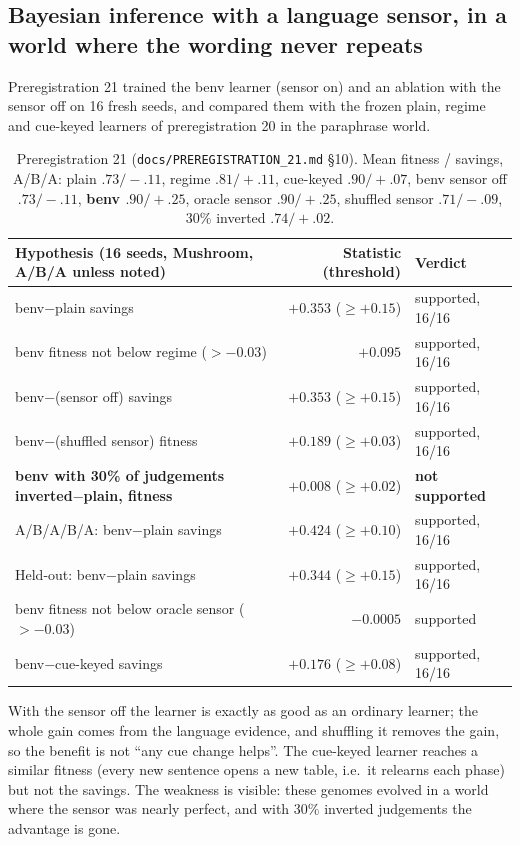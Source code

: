 \documentclass[11pt]{article}
\begin{document}
\subsection{Bayesian inference with a language sensor, in a world where the wording never repeats}
Preregistration 21 trained the benv learner (sensor on) and an ablation with the sensor off on 16 fresh seeds, and compared them with the frozen plain, regime and cue-keyed learners of preregistration 20 in the paraphrase world.
\begin{table}[h]\centering\small
\begin{tabular}{@{}p{6.3cm}rl@{}}\toprule
Hypothesis (16 seeds, Mushroom, A/B/A unless noted) & Statistic (threshold) & Verdict\\\midrule
benv$-$plain savings & $+0.353$ ($\ge+0.15$) & supported, 16/16\\
benv fitness not below regime ($>-0.03$) & $+0.095$ & supported, 16/16\\
benv$-$(sensor off) savings & $+0.353$ ($\ge+0.15$) & supported, 16/16\\
benv$-$(shuffled sensor) fitness & $+0.189$ ($\ge+0.03$) & supported, 16/16\\
\textbf{benv with 30\% of judgements inverted$-$plain, fitness} & $+0.008$ ($\ge+0.02$) & \textbf{not supported}\\
A/B/A/B/A: benv$-$plain savings & $+0.424$ ($\ge+0.10$) & supported, 16/16\\
Held-out: benv$-$plain savings & $+0.344$ ($\ge+0.15$) & supported, 16/16\\
benv fitness not below oracle sensor ($>-0.03$) & $-0.0005$ & supported\\
benv$-$cue-keyed savings & $+0.176$ ($\ge+0.08$) & supported, 16/16\\\bottomrule
\end{tabular}
\caption{\label{tab:benv}Preregistration 21 (\texttt{docs/PREREGISTRATION\_21.md} \S10). Mean fitness / savings, A/B/A: plain $.73/-.11$, regime $.81/+.11$, cue-keyed $.90/+.07$, benv sensor off $.73/-.11$, \textbf{benv $.90/+.25$}, oracle sensor $.90/+.25$, shuffled sensor $.71/-.09$, 30\% inverted $.74/+.02$.}
\end{table}
With the sensor off the learner is exactly as good as an ordinary learner; the whole gain comes from the language evidence, and shuffling it removes the gain, so the benefit is not ``any cue change helps''. The cue-keyed learner reaches a similar fitness (every new sentence opens a new table, i.e.\ it relearns each phase) but not the savings. The weakness is visible: these genomes evolved in a world where the sensor was nearly perfect, and with 30\% inverted judgements the advantage is gone.
\end{document}
